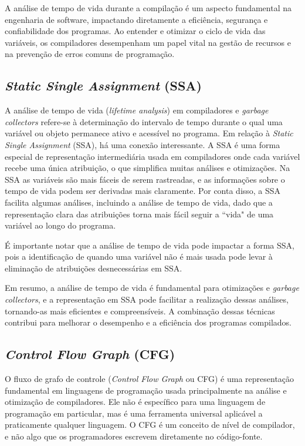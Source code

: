 \documentclass{article}
\begin{document}
    A análise de tempo de vida durante a compilação é um aspecto fundamental na engenharia de software,
    impactando diretamente a eficiência, segurança e confiabilidade dos programas. Ao entender e
    otimizar o ciclo de vida das variáveis, os compiladores desempenham um papel vital na gestão
    de recursos e na prevenção de erros comuns de programação.

    \subsection*{\emph{Static Single Assignment} (SSA)}

    A análise de tempo de vida (\emph{lifetime analysis}) em compiladores e \emph{garbage collectors} refere-se à
    determinação do intervalo de tempo durante o qual uma variável ou objeto permanece ativo e acessível no programa.
    Em relação à \emph{Static Single Assignment} (SSA), há uma conexão interessante. A SSA é uma forma especial de representação
    intermediária usada em compiladores onde cada variável recebe uma única atribuição, o que simplifica muitas análises e otimizações.
    Na SSA as variáveis são mais fáceis de serem rastreadas, e as informações sobre o tempo de vida podem ser derivadas mais claramente.
    Por conta disso, a SSA facilita algumas análises, incluindo a análise de tempo de vida, dado que a representação clara das
    atribuições torna mais fácil seguir a ``vida" de uma variável ao longo do programa.

    É importante notar que a análise de tempo de vida pode impactar a forma SSA, pois a identificação de quando uma variável não
    é mais usada pode levar à eliminação de atribuições desnecessárias em SSA.

    Em resumo, a análise de tempo de vida é fundamental para otimizações e \emph{garbage collectors}, e a representação em SSA pode
    facilitar a realização dessas análises, tornando-as mais eficientes e compreensíveis. A combinação dessas técnicas contribui
    para melhorar o desempenho e a eficiência dos programas compilados.

    \subsection*{\emph{Control Flow Graph} (CFG)}

    O fluxo de grafo de controle (\emph{Control Flow Graph} ou CFG) é uma representação fundamental em linguagens
    de programação usada principalmente na análise e otimização de compiladores. Ele não é específico para uma
    linguagem de programação em particular, mas é uma ferramenta universal aplicável a praticamente qualquer linguagem.
    O CFG é um conceito de nível de compilador, e não algo que os programadores escrevem diretamente no código-fonte.
\end{document}

